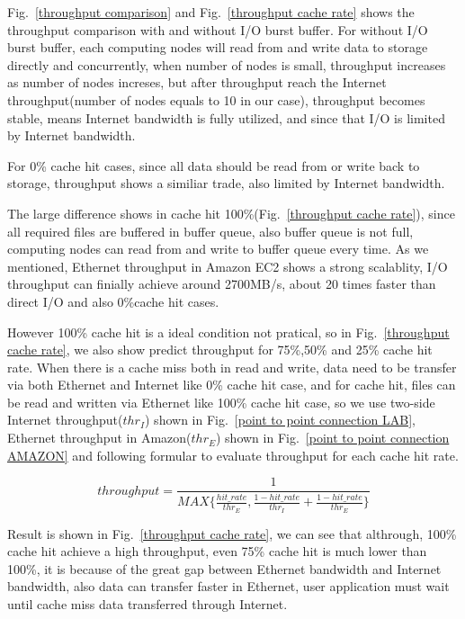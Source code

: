 Fig.~\ref{throughput comparison} and Fig.~\ref{throughput cache rate} shows the throughput comparison with and without I/O burst buffer.
For without I/O burst buffer, each computing nodes will read from and write data to storage directly and concurrently, when number of nodes is small, throughput increases as number of nodes increses, but after throughput reach the Internet throughput(number of nodes equals to 10 in our case), throughput becomes stable, means Internet bandwidth is fully utilized, and since that I/O is limited by Internet bandwidth.

For 0\% cache hit cases, since all data should be read from or write back to storage, throughput shows a similiar trade, also limited by Internet bandwidth.

The large difference shows in cache hit 100\%(Fig.~\ref{throughput cache rate}), since all required files are buffered in buffer queue, also buffer queue is not full, computing nodes can read from and write to buffer queue every time.
As we mentioned, Ethernet throughput in Amazon EC2 shows a strong scalablity, I/O throughput can finially achieve around 2700MB/s, about 20 times faster than direct I/O and also 0\%cache hit cases.

However 100\% cache hit is a ideal condition not pratical, so in Fig.~\ref{throughput cache rate}, we also show predict throughput for 75\%,50\% and 25\% cache hit rate.
When there is a cache miss both in read and write, data need to be transfer via both Ethernet and Internet like 0\% cache hit case, and for cache hit, files can be read and written via Ethernet like 100\% cache hit case, so we use two-side Internet throughput($thr_I$) shown in Fig.~\ref{point to point connection LAB}, Ethernet throughput in Amazon($thr_E$) shown in Fig.~\ref{point to point connection AMAZON} and following formular to evaluate throughput for each cache hit rate.

\[throughput=\frac{1}{MAX\{\frac{{hit\_rate}}{thr_E},\frac{1-hit\_rate}{thr_I}+\frac{1-hit\_rate}{thr_E}\}}\]

Result is shown in Fig.~\ref{throughput cache rate}, we can see that althrough, 100\% cache hit achieve a high throughput, even 75\% cache hit is much lower than 100\%, it is because of the great gap between Ethernet bandwidth and Internet bandwidth, also data can transfer faster in Ethernet, user application must wait until cache miss data transferred through Internet.


